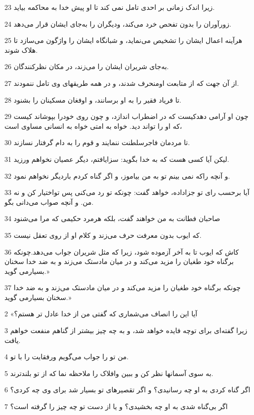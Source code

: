 \par 23 زیرا اندک زمانی بر احدی تامل نمی کند تا او پیش خدا به محاکمه بیاید.
\par 24 زورآوران را بدون تفحص خرد می‌کند، ودیگران را به‌جای ایشان قرار می‌دهد.
\par 25 هرآینه اعمال ایشان را تشخیص می‌نماید، و شبانگاه ایشان را واژگون می‌سازد تا هلاک شوند.
\par 26 به‌جای شریران ایشان را می‌زند، در مکان نظرکنندگان.
\par 27 از آن جهت که از متابعت اومنحرف شدند، و در همه طریقهای وی تامل ننمودند.
\par 28 تا فریاد فقیر را به او برسانند، و اوفغان مسکینان را بشنود.
\par 29 چون او آرامی دهدکیست که در اضطراب اندازد، و چون روی خودرا بپوشاند کیست که او را تواند دید. خواه به امتی خواه به انسانی مساوی است،
\par 30 تا مردمان فاجرسلطنت ننمایند و قوم را به دام گرفتار نسازند.
\par 31 لیکن آیا کسی هست که به خدا بگوید: سزایافتم، دیگر عصیان نخواهم ورزید.
\par 32 و آنچه راکه نمی بینم تو به من بیاموز، و اگر گناه کردم باردیگر نخواهم نمود.
\par 33 آیا برحسب رای تو جزاداده، خواهد گفت: چونکه تو رد می‌کنی پس تواختیار کن و نه من. و آنچه صواب می‌دانی بگو.
\par 34 صاحبان فطانت به من خواهند گفت، بلکه هرمرد حکیمی که مرا می‌شنود
\par 35 که ایوب بدون معرفت حرف می‌زند و کلام او از روی تعقل نیست.
\par 36 کاش که ایوب تا به آخر آزموده شود، زیرا که مثل شریران جواب می‌دهد.چونکه برگناه خود طغیان را مزید می‌کند و در میان مادستک می‌زند و به ضد خدا سخنان بسیارمی گوید.»
\par 37 چونکه برگناه خود طغیان را مزید می‌کند و در میان مادستک می‌زند و به ضد خدا سخنان بسیارمی گوید.»
\par 2 «آیا این را انصاف می‌شماری که گفتی من از خدا عادل تر هستم؟
\par 3 زیرا گفته‌ای برای توچه فایده خواهد شد، و به چه چیز بیشتر از گناهم منفعت خواهم یافت.
\par 4 من تو را جواب می‌گویم ورفقایت را با تو.
\par 5 به سوی آسمانها نظر کن و ببین وافلاک را ملاحظه نما که از تو بلندترند.
\par 6 اگر گناه کردی به او چه رسانیدی؟ و اگر تقصیرهای تو بسیار شد برای وی چه کردی؟
\par 7 اگر بی‌گناه شدی به او چه بخشیدی؟ و یا از دست تو چه چیز را گرفته است؟
